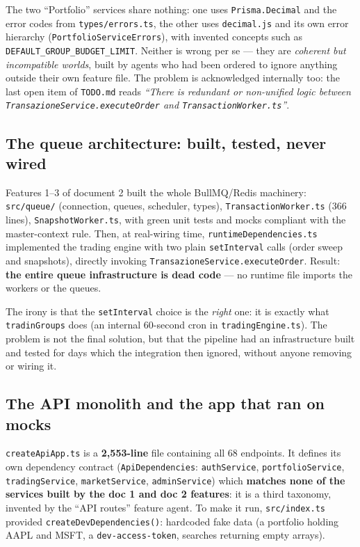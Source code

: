 \documentclass[11pt,a4paper]{article}
\newcommand{\file}[1]{\texttt{\small #1}}
\begin{document}
The two ``Portfolio'' services share nothing: one uses \file{Prisma.Decimal} and the error codes from \file{types/errors.ts}, the other uses \file{decimal.js} and its own error hierarchy (\file{PortfolioServiceErrors}), with invented concepts such as \file{DEFAULT\_GROUP\_BUDGET\_LIMIT}. Neither is wrong per se --- they are \emph{coherent but incompatible worlds}, built by agents who had been ordered to ignore anything outside their own feature file. The problem is acknowledged internally too: the last open item of \file{TODO.md} reads \emph{``There is redundant or non-unified logic between \file{TransazioneService.executeOrder} and \file{TransactionWorker.ts}''}.

\subsection{The queue architecture: built, tested, never wired}

Features 1--3 of document 2 built the whole BullMQ/Redis machinery: \file{src/queue/} (connection, queues, scheduler, types), \file{TransactionWorker.ts} (366 lines), \file{SnapshotWorker.ts}, with green unit tests and mocks compliant with the master-context rule. Then, at real-wiring time, \file{runtimeDependencies.ts} implemented the trading engine with two plain \file{setInterval} calls (order sweep and snapshots), directly invoking \file{TransazioneService.executeOrder}. Result: \textbf{the entire queue infrastructure is dead code} --- no runtime file imports the workers or the queues.

The irony is that the \file{setInterval} choice is the \emph{right} one: it is exactly what \file{tradinGroups} does (an internal 60-second cron in \file{tradingEngine.ts}). The problem is not the final solution, but that the pipeline had an infrastructure built and tested for days which the integration then ignored, without anyone removing or wiring it.

\subsection{The API monolith and the app that ran on mocks}

\file{createApiApp.ts} is a \textbf{2{,}553-line} file containing all 68 endpoints. It defines its own dependency contract (\file{ApiDependencies}: \file{authService}, \file{portfolioService}, \file{tradingService}, \file{marketService}, \file{adminService}) which \textbf{matches none of the services built by the doc 1 and doc 2 features}: it is a third taxonomy, invented by the ``API routes'' feature agent. To make it run, \file{src/index.ts} provided \file{createDevDependencies()}: hardcoded fake data (a portfolio holding AAPL and MSFT, a \file{dev-access-token}, searches returning empty arrays).
\end{document}
